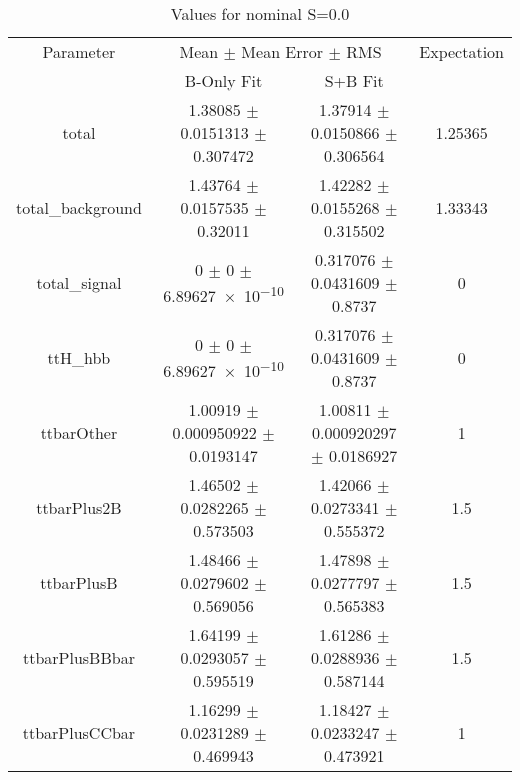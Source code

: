\begin{table}
\centering
\caption{Values for nominal S=0.0}
\begin{tabular}{cccc}
\toprule
Parameter & \multicolumn{2}{c}{Mean $\pm$ Mean Error $\pm$ RMS} & Expectation\\
 & B-Only Fit & S+B Fit & \\
\midrule
total & \num{1.38085} $\pm$ \num{0.0151313} $\pm$ \num{0.307472} & \num{1.37914} $\pm$ \num{0.0150866} $\pm$ \num{0.306564} & \num{1.25365}\\
total\_background & \num{1.43764} $\pm$ \num{0.0157535} $\pm$ \num{0.32011} & \num{1.42282} $\pm$ \num{0.0155268} $\pm$ \num{0.315502} & \num{1.33343}\\
total\_signal & \num{0} $\pm$ \num{0} $\pm$ \num{6.89627e-10} & \num{0.317076} $\pm$ \num{0.0431609} $\pm$ \num{0.8737} & \num{0}\\
ttH\_hbb & \num{0} $\pm$ \num{0} $\pm$ \num{6.89627e-10} & \num{0.317076} $\pm$ \num{0.0431609} $\pm$ \num{0.8737} & \num{0}\\
ttbarOther & \num{1.00919} $\pm$ \num{0.000950922} $\pm$ \num{0.0193147} & \num{1.00811} $\pm$ \num{0.000920297} $\pm$ \num{0.0186927} & \num{1}\\
ttbarPlus2B & \num{1.46502} $\pm$ \num{0.0282265} $\pm$ \num{0.573503} & \num{1.42066} $\pm$ \num{0.0273341} $\pm$ \num{0.555372} & \num{1.5}\\
ttbarPlusB & \num{1.48466} $\pm$ \num{0.0279602} $\pm$ \num{0.569056} & \num{1.47898} $\pm$ \num{0.0277797} $\pm$ \num{0.565383} & \num{1.5}\\
ttbarPlusBBbar & \num{1.64199} $\pm$ \num{0.0293057} $\pm$ \num{0.595519} & \num{1.61286} $\pm$ \num{0.0288936} $\pm$ \num{0.587144} & \num{1.5}\\
ttbarPlusCCbar & \num{1.16299} $\pm$ \num{0.0231289} $\pm$ \num{0.469943} & \num{1.18427} $\pm$ \num{0.0233247} $\pm$ \num{0.473921} & \num{1}\\
\bottomrule
\end{tabular}
\end{table}